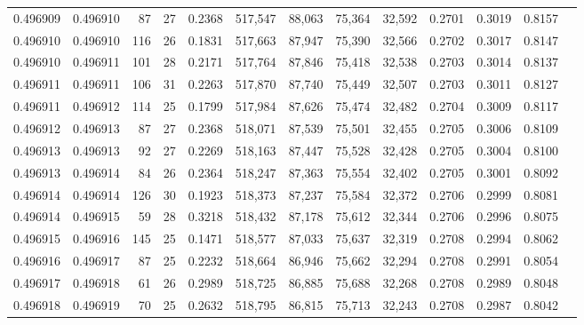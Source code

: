 \begin{tabular}{rrrrrrrrrrrrr}
0.496909 & 0.496910 &  87 &  27 &                                     0.2368 & 517,547 &  88,063 &  75,364 &  32,592 & 0.2701 & 0.3019 & 0.8157 \\
0.496910 & 0.496910 & 116 &  26 &                                     0.1831 & 517,663 &  87,947 &  75,390 &  32,566 & 0.2702 & 0.3017 & 0.8147 \\
0.496910 & 0.496911 & 101 &  28 &                                     0.2171 & 517,764 &  87,846 &  75,418 &  32,538 & 0.2703 & 0.3014 & 0.8137 \\
0.496911 & 0.496911 & 106 &  31 &                                     0.2263 & 517,870 &  87,740 &  75,449 &  32,507 & 0.2703 & 0.3011 & 0.8127 \\
0.496911 & 0.496912 & 114 &  25 &                                     0.1799 & 517,984 &  87,626 &  75,474 &  32,482 & 0.2704 & 0.3009 & 0.8117 \\
0.496912 & 0.496913 &  87 &  27 &                                     0.2368 & 518,071 &  87,539 &  75,501 &  32,455 & 0.2705 & 0.3006 & 0.8109 \\
0.496913 & 0.496913 &  92 &  27 &                                     0.2269 & 518,163 &  87,447 &  75,528 &  32,428 & 0.2705 & 0.3004 & 0.8100 \\
0.496913 & 0.496914 &  84 &  26 &                                     0.2364 & 518,247 &  87,363 &  75,554 &  32,402 & 0.2705 & 0.3001 & 0.8092 \\
0.496914 & 0.496914 & 126 &  30 &                                     0.1923 & 518,373 &  87,237 &  75,584 &  32,372 & 0.2706 & 0.2999 & 0.8081 \\
0.496914 & 0.496915 &  59 &  28 &                                     0.3218 & 518,432 &  87,178 &  75,612 &  32,344 & 0.2706 & 0.2996 & 0.8075 \\
0.496915 & 0.496916 & 145 &  25 &                                     0.1471 & 518,577 &  87,033 &  75,637 &  32,319 & 0.2708 & 0.2994 & 0.8062 \\
0.496916 & 0.496917 &  87 &  25 &                                     0.2232 & 518,664 &  86,946 &  75,662 &  32,294 & 0.2708 & 0.2991 & 0.8054 \\
0.496917 & 0.496918 &  61 &  26 &                                     0.2989 & 518,725 &  86,885 &  75,688 &  32,268 & 0.2708 & 0.2989 & 0.8048 \\
0.496918 & 0.496919 &  70 &  25 &                                     0.2632 & 518,795 &  86,815 &  75,713 &  32,243 & 0.2708 & 0.2987 & 0.8042 \\

\end{tabular}
